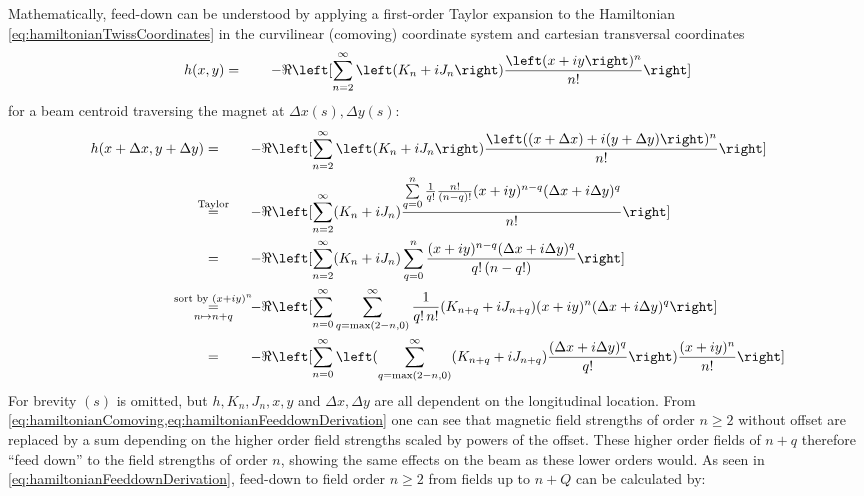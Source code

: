Mathematically, feed-down can be understood by applying a first-order Taylor expansion 
to the Hamiltonian \cref{eq:hamiltonianTwissCoordinates} in the 
curvilinear (comoving) coordinate system and cartesian transversal coordinates
%
\begin{equation}
   \label{eq:hamiltonianComoving}
   h(x, y)
   = \qquad 
   -\ReOf{\sum_{n = 2}^\infty \left(K_n + iJ_n\right)\frac{\left(x + iy\right)^n}{n!}}
\end{equation}
%
for a beam centroid traversing the magnet at $\Delta x (s), \Delta y (s)$:
%
\begin{equation}
   \label{eq:hamiltonianFeeddownDerivation}
   \begin{split}
   h(x + \Delta x, y + \Delta y)
   &= \qquad 
   -\ReOf{\sum_{n = 2}^\infty \left(K_n + iJ_n\right)\frac{\left((x + \Delta x) +i (y + \Delta y)\right)^n}{n!}} \\
   &\overeq{\text{Taylor}} \qquad
    -\ReOf{
        \sum_{n = 2}^\infty (K_n + iJ_n)
        \frac{\sum\limits_{q=0}^{n} \frac{1}{q!} \frac{n!}{(n-q)!}(x+iy)^{n-q} (\Delta x + i \Delta y)^q}{n!}
    } \\
    &=\qquad
     -\ReOf{
         \sum_{n = 2}^\infty (K_n + iJ_n)
         \sum\limits_{q = 0}^{n} \frac{(x+iy)^{n-q} (\Delta x + i \Delta y)^q}{q!\, (n-q!)} 
      } \\
     &\myoverunder{\text{sort by } (x + iy)^n}{=}{n \mapsto n+q} \qquad
     - \ReOf{
        \sum_{n = 0}^\infty \sum_{q=\max(2-n, 0)}^{\infty} \frac{1}{q!\, n!}
        (K_{n+q} + iJ_{n+q}) (x + iy)^n (\Delta x + i \Delta y)^q 
     } \\
     &= \qquad
     - \ReOf{\sum_{n = 0}^\infty 
        \left( \sum_{q=\max(2-n, 0)}^{\infty} 
        (K_{n+q} + iJ_{n+q}) \frac{(\Delta x + i \Delta y)^q}{q!} \right)
        \frac{(x + iy)^n}{n!}
     }
   \end{split}
\end{equation}
%
For brevity $(s)$ is omitted, but $h, K_n, J_n, x, y$ and $\Delta x, \Delta y$ are all dependent on the longitudinal location.
From \cref{eq:hamiltonianComoving,eq:hamiltonianFeeddownDerivation} 
one can see that magnetic field strengths
of order $n \geq 2$ without offset are replaced by a sum depending on the 
higher order field strengths scaled by powers of the offset.
These higher order fields of $n+q$ therefore ``feed down'' to the field strengths of 
order $n$, showing the same effects on the beam as these lower orders would.
As seen in \cref{eq:hamiltonianFeeddownDerivation}, 
feed-down to field order $n \geq 2$ from fields up to $n + Q$ can be calculated by:
